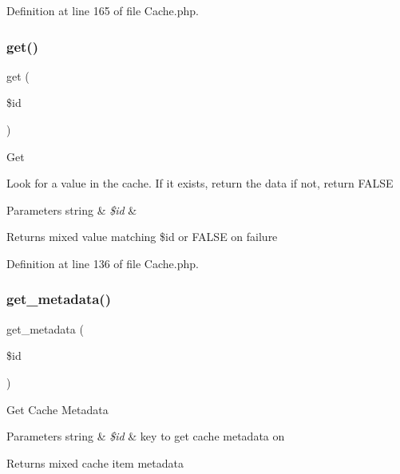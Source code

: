 Definition at line 165 of file Cache.\+php.

\mbox{\label{class_c_i___cache_a50e3bfb586b2f42932a6a93f3fbb0828}} 
\subsubsection{\texorpdfstring{get()}{get()}}
{\footnotesize\ttfamily get (\begin{DoxyParamCaption}\item[{}]{\$id }\end{DoxyParamCaption})}

Get

Look for a value in the cache. If it exists, return the data if not, return F\+A\+L\+SE


\begin{DoxyParams}[1]{Parameters}
string & {\em \$id} & \\
\hline
\end{DoxyParams}
\begin{DoxyReturn}{Returns}
mixed value matching \$id or F\+A\+L\+SE on failure 
\end{DoxyReturn}


Definition at line 136 of file Cache.\+php.

\mbox{\label{class_c_i___cache_a59635cf18e997c5141bffa05ff7622e0}} 
\subsubsection{\texorpdfstring{get\_metadata()}{get\_metadata()}}
{\footnotesize\ttfamily get\+\_\+metadata (\begin{DoxyParamCaption}\item[{}]{\$id }\end{DoxyParamCaption})}

Get Cache Metadata


\begin{DoxyParams}[1]{Parameters}
string & {\em \$id} & key to get cache metadata on \\
\hline
\end{DoxyParams}
\begin{DoxyReturn}{Returns}
mixed cache item metadata 
\end{DoxyReturn}


